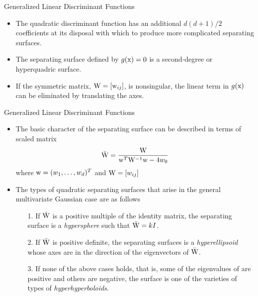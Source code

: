 \begin{frame}{Generalized Linear Discriminant Functions}
\begin{itemize}
\item The quadratic discriminant function has an additional $d(d+1)/2$ coefficients at its disposal with which to produce more complicated separating surfaces.
\item The separating surface defined by $g({\rm x})=0$ is a second-degree or hyperquadric surface.
\item If the symmetric matrix, ${\rm W} = [{\rm w}_{ij}]$, is nonsingular, the linear term in $g({\rm x})$ can be eliminated by translating the axes. 

\end{itemize}
\vspace{3cm}
\end{frame}

\begin{frame}{Generalized Linear Discriminant Functions}
\begin{itemize}
\item The basic character of the separating surface can be described in terms of scaled matrix
\begin{equation}
\bar{\rm W} = \frac{{\rm W}}{{{{\rm w}^T}{{\rm W}^{ - 1}}{\rm w} - 4{w_0}}} \nonumber
\end{equation}
where ${\rm w}=(w_1,\ldots,w_d)^T$ and ${\rm W}=[w_{ij}]$
\item The types of quadratic separating surfaces that arise in the general multivariate Gaussian case are as follows
\begin{itemize}
\item[1.] If $\bar{\rm W}$ is a positive multiple of the identity matrix, the separating surface is a \textit{\color{mycolor2}hypersphere} such that $\bar{\rm W}=kI$.
\item[2.] If $\bar{\rm W}$ is positive definite, the separating surfaces is a \textit{\color{mycolor3}hyperellipsoid} whose axes are in the direction of the eigenvectors of $\bar{\rm W}$.
\item[3.] If none of the above cases holds, that is, some of the eigenvalues of are positive and others are negative,
the surface is one of the varieties of types of \textit{\color{mycolor4}hyperhyperboloids}.
\end{itemize}
\end{itemize}
\end{frame}

